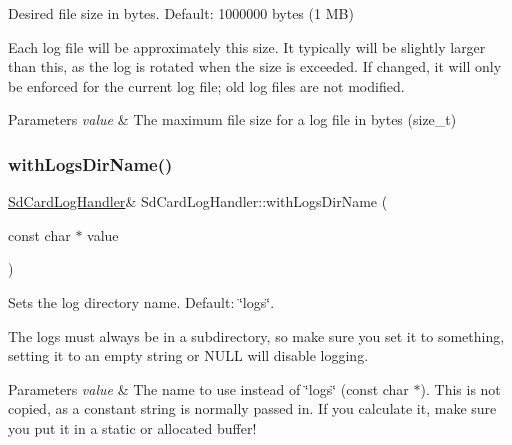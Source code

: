 Desired file size in bytes. Default\+: 1000000 bytes (1 MB) 

Each log file will be approximately this size. It typically will be slightly larger than this, as the log is rotated when the size is exceeded. If changed, it will only be enforced for the current log file; old log files are not modified.


\begin{DoxyParams}{Parameters}
{\em value} & The maximum file size for a log file in bytes (size\+\_\+t) \\
\hline
\end{DoxyParams}
\mbox{\label{class_sd_card_log_handler_a6f6d18ab8065c69c1334191defa702f2}} 
\subsubsection{\texorpdfstring{with\+Logs\+Dir\+Name()}{withLogsDirName()}}
{\footnotesize\ttfamily \mbox{\hyperlink{class_sd_card_log_handler}{Sd\+Card\+Log\+Handler}}\& Sd\+Card\+Log\+Handler\+::with\+Logs\+Dir\+Name (\begin{DoxyParamCaption}\item[{const char $\ast$}]{value }\end{DoxyParamCaption})\hspace{0.3cm}{\ttfamily [inline]}}



Sets the log directory name. Default\+: \char`\"{}logs\char`\"{}. 

The logs must always be in a subdirectory, so make sure you set it to something, setting it to an empty string or N\+U\+LL will disable logging.


\begin{DoxyParams}{Parameters}
{\em value} & The name to use instead of \char`\"{}logs\char`\"{} (const char $\ast$). This is not copied, as a constant string is normally passed in. If you calculate it, make sure you put it in a static or allocated buffer! \\
\hline
\end{DoxyParams}
\mbox{\label{class_sd_card_log_handler_a0a126f5fd8c00b51e49319583f32b0c1}} 

